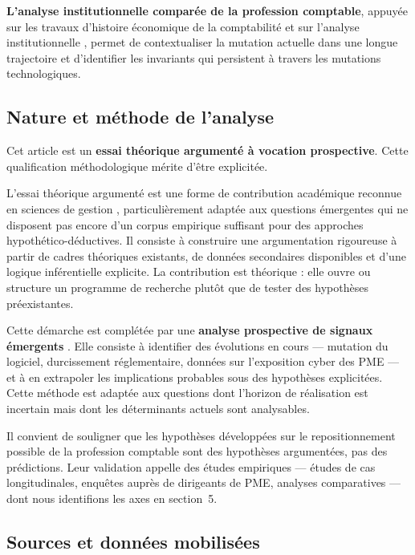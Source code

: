 \documentclass[12pt,a4paper]{article}
\begin{document}
\textbf{L'analyse institutionnelle comparée de la profession comptable}, appuyée sur les travaux d'histoire économique de la comptabilité \parencite{pacioli1494, minaud2006} et sur l'analyse institutionnelle \parencite{north1990, dimaggio1983}, permet de contextualiser la mutation actuelle dans une longue trajectoire et d'identifier les invariants qui persistent à travers les mutations technologiques.

\subsection{Nature et méthode de l'analyse}

Cet article est un \textbf{essai théorique argumenté à vocation prospective}. Cette qualification méthodologique mérite d'être explicitée.

L'essai théorique argumenté est une forme de contribution académique reconnue en sciences de gestion \parencite{weick1989, whetten1989}, particulièrement adaptée aux questions émergentes qui ne disposent pas encore d'un corpus empirique suffisant pour des approches hypothético-déductives. Il consiste à construire une argumentation rigoureuse à partir de cadres théoriques existants, de données secondaires disponibles et d'une logique inférentielle explicite. La contribution est théorique : elle ouvre ou structure un programme de recherche plutôt que de tester des hypothèses préexistantes.

Cette démarche est complétée par une \textbf{analyse prospective de signaux émergents} \parencite{ansoff1975, godet2007}. Elle consiste à identifier des évolutions en cours — mutation du logiciel, durcissement réglementaire, données sur l'exposition cyber des PME — et à en extrapoler les implications probables sous des hypothèses explicitées. Cette méthode est adaptée aux questions dont l'horizon de réalisation est incertain mais dont les déterminants actuels sont analysables.

Il convient de souligner que les hypothèses développées sur le repositionnement possible de la profession comptable sont des hypothèses argumentées, pas des prédictions. Leur validation appelle des études empiriques — études de cas longitudinales, enquêtes auprès de dirigeants de PME, analyses comparatives — dont nous identifions les axes en section~5.

\subsection{Sources et données mobilisées}
\end{document}
